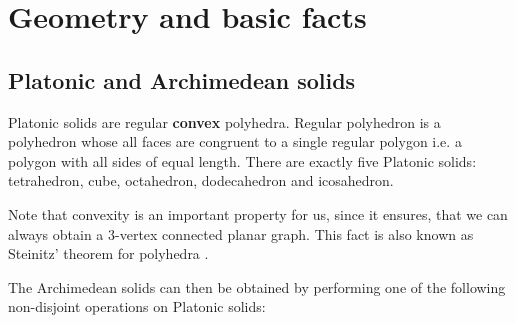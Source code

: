 \chapter{Geometry and basic facts}

\section{Platonic and Archimedean solids}

Platonic solids are regular \textbf{convex} polyhedra. Regular polyhedron is a polyhedron whose all faces are congruent to a single regular polygon i.e. a polygon with all sides of equal length. There are exactly five Platonic solids: tetrahedron, cube, octahedron, dodecahedron and icosahedron.

Note that convexity is an important property for us, since it ensures, that we can always obtain a 3-vertex connected planar graph. This fact is also known as Steinitz’ theorem for polyhedra \cite{kendall24}.

The Archimedean solids can then be obtained by performing one of the following non-disjoint operations on Platonic solids:

